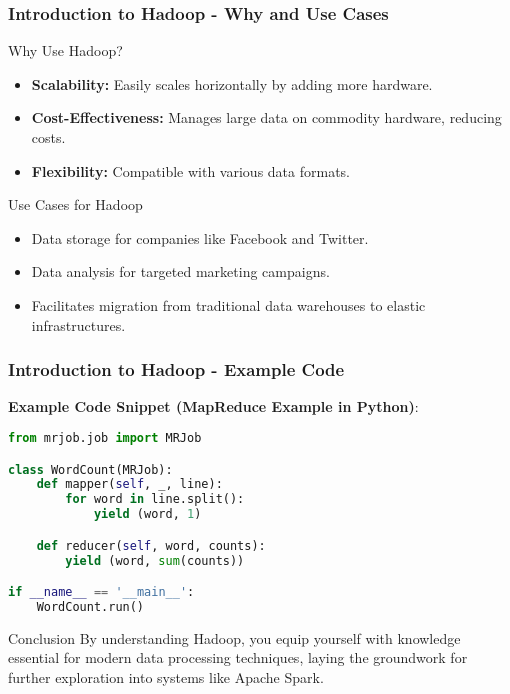 \documentclass[aspectratio=169]{beamer}
\begin{document}
\begin{frame}[fragile]
    \frametitle{Introduction to Hadoop - Why and Use Cases}
    \begin{block}{Why Use Hadoop?}
        \begin{itemize}
            \item \textbf{Scalability:} Easily scales horizontally by adding more hardware.
            \item \textbf{Cost-Effectiveness:} Manages large data on commodity hardware, reducing costs.
            \item \textbf{Flexibility:} Compatible with various data formats.
        \end{itemize}
    \end{block}
    
    \begin{block}{Use Cases for Hadoop}
        \begin{itemize}
            \item Data storage for companies like Facebook and Twitter.
            \item Data analysis for targeted marketing campaigns.
            \item Facilitates migration from traditional data warehouses to elastic infrastructures.
        \end{itemize}
    \end{block}
\end{frame}

\begin{frame}[fragile]
    \frametitle{Introduction to Hadoop - Example Code}
    \textbf{Example Code Snippet (MapReduce Example in Python)}:
    \begin{lstlisting}[language=Python]
from mrjob.job import MRJob

class WordCount(MRJob):
    def mapper(self, _, line):
        for word in line.split():
            yield (word, 1)

    def reducer(self, word, counts):
        yield (word, sum(counts))

if __name__ == '__main__':
    WordCount.run()
    \end{lstlisting}
    \begin{block}{Conclusion}
        By understanding Hadoop, you equip yourself with knowledge essential for modern data processing techniques, laying the groundwork for further exploration into systems like Apache Spark.
    \end{block}
\end{frame}
\end{document}
